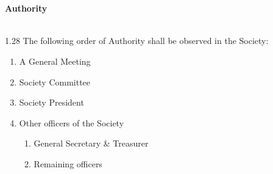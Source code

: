\documentclass[a4paper,twoside,notitlepage,11pt]{article}
\newcommand{\consHead}[1]{\begin{Large}\textbf{#1}\end{Large}\ \\}
\begin{document}
\ \\
\ \\
\consHead{Authority}
1.28 The following order of Authority shall be observed in the Society:
\begin{enumerate}
	\item A General Meeting
	\item Society Committee
	\item Society President
	\item Other officers of the Society
	\begin{enumerate}
		\item General Secretary \& Treasurer
		\item Remaining officers
	\end{enumerate}
\end{enumerate}
\end{document}
